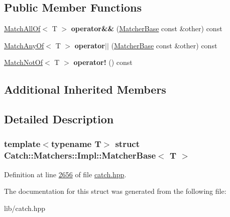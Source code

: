 \subsection*{Public Member Functions}
\begin{DoxyCompactItemize}
\item 
\mbox{\label{structCatch_1_1Matchers_1_1Impl_1_1MatcherBase_a23c336f6d9457735ddc8dc7ea864d7c9}} 
\mbox{\hyperlink{structCatch_1_1Matchers_1_1Impl_1_1MatchAllOf}{Match\+All\+Of}}$<$ T $>$ {\bfseries operator\&\&} (\mbox{\hyperlink{structCatch_1_1Matchers_1_1Impl_1_1MatcherBase}{Matcher\+Base}} const \&other) const
\item 
\mbox{\label{structCatch_1_1Matchers_1_1Impl_1_1MatcherBase_a5f8542b8f1567a6f9c65d0a6da7b679b}} 
\mbox{\hyperlink{structCatch_1_1Matchers_1_1Impl_1_1MatchAnyOf}{Match\+Any\+Of}}$<$ T $>$ {\bfseries operator$\vert$$\vert$} (\mbox{\hyperlink{structCatch_1_1Matchers_1_1Impl_1_1MatcherBase}{Matcher\+Base}} const \&other) const
\item 
\mbox{\label{structCatch_1_1Matchers_1_1Impl_1_1MatcherBase_a5bb94bf2ff5c7ef73b7c11eb173bdf3b}} 
\mbox{\hyperlink{structCatch_1_1Matchers_1_1Impl_1_1MatchNotOf}{Match\+Not\+Of}}$<$ T $>$ {\bfseries operator!} () const
\end{DoxyCompactItemize}
\subsection*{Additional Inherited Members}


\subsection{Detailed Description}
\subsubsection*{template$<$typename T$>$\newline
struct Catch\+::\+Matchers\+::\+Impl\+::\+Matcher\+Base$<$ T $>$}



Definition at line \mbox{\hyperlink{catch_8hpp_source_l02656}{2656}} of file \mbox{\hyperlink{catch_8hpp_source}{catch.\+hpp}}.



The documentation for this struct was generated from the following file\+:\begin{DoxyCompactItemize}
\item 
lib/catch.\+hpp\end{DoxyCompactItemize}
